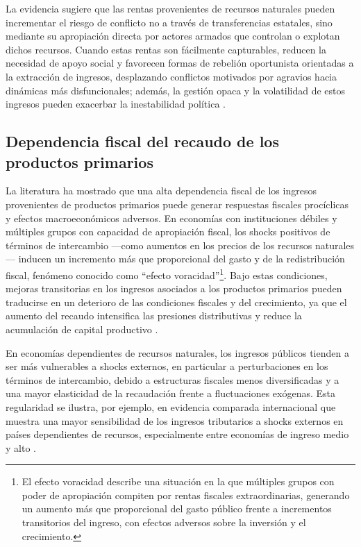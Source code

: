 \documentclass[../../TFM.tex]{subfiles}
\begin{document}
	La evidencia sugiere que las rentas provenientes de recursos naturales pueden incrementar el riesgo de conflicto no a través de transferencias estatales, sino mediante su apropiación directa por actores armados que controlan o explotan dichos recursos. Cuando estas rentas son fácilmente capturables, reducen la necesidad de apoyo social y favorecen formas de rebelión oportunista orientadas a la extracción de ingresos, desplazando conflictos motivados por agravios hacia dinámicas más disfuncionales; además, la gestión opaca y la volatilidad de estos ingresos pueden exacerbar la inestabilidad política \parencite{Coller2005}.
	
	\subsection{Dependencia fiscal del recaudo de los productos primarios}
	\label{subsec:dependencia-fiscal}
	
	La literatura ha mostrado que una alta dependencia fiscal de los ingresos provenientes de productos primarios puede generar respuestas fiscales procíclicas y efectos macroeconómicos adversos. En economías con instituciones débiles y múltiples grupos con capacidad de apropiación fiscal, los shocks positivos de términos de intercambio —como aumentos en los precios de los recursos naturales— inducen un incremento más que proporcional del gasto y de la redistribución fiscal, fenómeno conocido como “efecto voracidad”\footnote{El efecto voracidad describe una situación en la que múltiples grupos con poder de apropiación compiten por rentas fiscales extraordinarias, generando un aumento más que proporcional del gasto público frente a incrementos transitorios del ingreso, con efectos adversos sobre la inversión y el crecimiento.}. Bajo estas condiciones, mejoras transitorias en los ingresos asociados a los productos primarios pueden traducirse en un deterioro de las condiciones fiscales y del crecimiento, ya que el aumento del recaudo intensifica las presiones distributivas y reduce la acumulación de capital productivo \parencite{Tornell1999}.
	
	En economías dependientes de recursos naturales, los ingresos públicos tienden a ser más vulnerables a shocks externos, en particular a perturbaciones en los términos de intercambio, debido a estructuras fiscales menos diversificadas y a una mayor elasticidad de la recaudación frente a fluctuaciones exógenas. Esta regularidad se ilustra, por ejemplo, en evidencia comparada internacional que muestra una mayor sensibilidad de los ingresos tributarios a shocks externos en países dependientes de recursos, especialmente entre economías de ingreso medio y alto \parencite{vonHaldenwang2018}.
	
\end{document}
